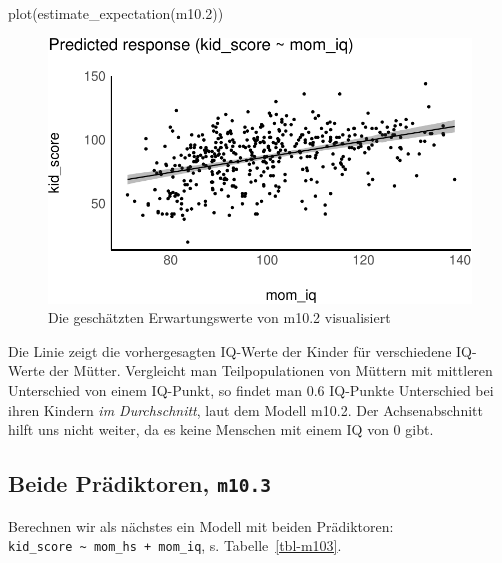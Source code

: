 \documentclass[
  a4paper,
  DIV=11]{scrreprt}
\newenvironment{Shaded}{\begin{snugshade}}{\end{snugshade}}
\newcommand{\FloatTok}[1]{\textcolor[rgb]{0.68,0.00,0.00}{#1}}
\newcommand{\FunctionTok}[1]{\textcolor[rgb]{0.28,0.35,0.67}{#1}}
\newcommand{\NormalTok}[1]{\textcolor[rgb]{0.00,0.23,0.31}{#1}}
\theoremstyle{definition}
\theoremstyle{remark}
\begin{document}
\begin{Shaded}
\begin{Highlighting}[]
\FunctionTok{plot}\NormalTok{(}\FunctionTok{estimate\_expectation}\NormalTok{(m10}\FloatTok{.2}\NormalTok{))}
\end{Highlighting}
\end{Shaded}

\begin{figure}[H]

{\centering \includegraphics{./metrische-AV_files/figure-pdf/fig-m102-a-1.pdf}

}

\caption{\label{fig-m102-a}Die geschätzten Erwartungswerte von m10.2
visualisiert}

\end{figure}

Die Linie zeigt die vorhergesagten IQ-Werte der Kinder für verschiedene
IQ-Werte der Mütter. Vergleicht man Teilpopulationen von Müttern mit
mittleren Unterschied von einem IQ-Punkt, so findet man 0.6 IQ-Punkte
Unterschied bei ihren Kindern \emph{im Durchschnitt}, laut dem Modell
m10.2. Der Achsenabschnitt hilft uns nicht weiter, da es keine Menschen
mit einem IQ von 0 gibt.

\hypertarget{beide-pruxe4diktoren-m10.3}{%
\subsection{\texorpdfstring{Beide Prädiktoren,
\texttt{m10.3}}{Beide Prädiktoren, m10.3}}\label{beide-pruxe4diktoren-m10.3}}

Berechnen wir als nächstes ein Modell mit beiden Prädiktoren:
\texttt{kid\_score\ \textasciitilde{}\ mom\_hs\ +\ mom\_iq}, s.
Tabelle~\ref{tbl-m103}.
\end{document}
